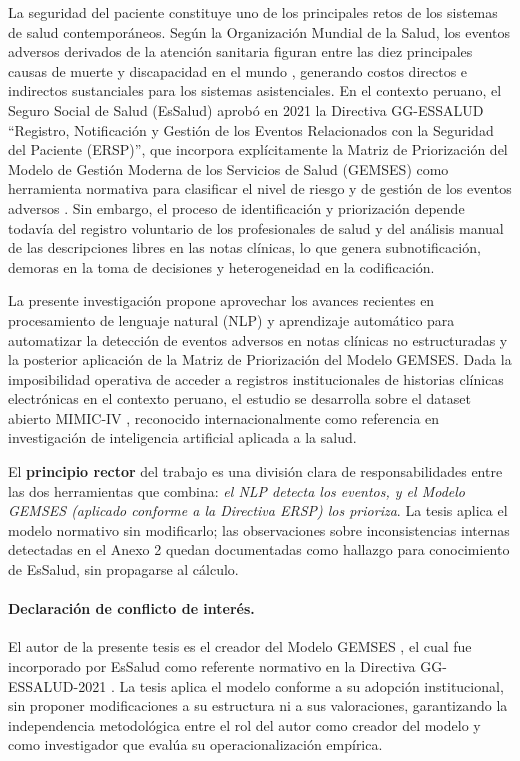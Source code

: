 La seguridad del paciente constituye uno de los principales retos de los sistemas de salud contemporáneos. Según la Organización Mundial de la Salud, los eventos adversos derivados de la atención sanitaria figuran entre las diez principales causas de muerte y discapacidad en el mundo \citep{who2019}, generando costos directos e indirectos sustanciales para los sistemas asistenciales. En el contexto peruano, el Seguro Social de Salud (EsSalud) aprobó en 2021 la Directiva GG-ESSALUD ``Registro, Notificación y Gestión de los Eventos Relacionados con la Seguridad del Paciente (ERSP)'', que incorpora explícitamente la Matriz de Priorización del Modelo de Gestión Moderna de los Servicios de Salud (GEMSES) como herramienta normativa para clasificar el nivel de riesgo y de gestión de los eventos adversos \citep{essalud2021}. Sin embargo, el proceso de identificación y priorización depende todavía del registro voluntario de los profesionales de salud y del análisis manual de las descripciones libres en las notas clínicas, lo que genera subnotificación, demoras en la toma de decisiones y heterogeneidad en la codificación.

La presente investigación propone aprovechar los avances recientes en procesamiento de lenguaje natural (NLP) y aprendizaje automático para automatizar la detección de eventos adversos en notas clínicas no estructuradas y la posterior aplicación de la Matriz de Priorización del Modelo GEMSES. Dada la imposibilidad operativa de acceder a registros institucionales de historias clínicas electrónicas en el contexto peruano, el estudio se desarrolla sobre el dataset abierto MIMIC-IV \citep{johnson2023mimic}, reconocido internacionalmente como referencia en investigación de inteligencia artificial aplicada a la salud.

El \textbf{principio rector} del trabajo es una división clara de responsabilidades entre las dos herramientas que combina: \emph{el NLP detecta los eventos, y el Modelo GEMSES (aplicado conforme a la Directiva ERSP) los prioriza}. La tesis aplica el modelo normativo sin modificarlo; las observaciones sobre inconsistencias internas detectadas en el Anexo 2 quedan documentadas como hallazgo para conocimiento de EsSalud, sin propagarse al cálculo.

\paragraph{Declaración de conflicto de interés.}
El autor de la presente tesis es el creador del Modelo GEMSES \citep{perez2021gemses}, el cual fue incorporado por EsSalud como referente normativo en la Directiva GG-ESSALUD-2021 \citep{essalud2021}. La tesis aplica el modelo conforme a su adopción institucional, sin proponer modificaciones a su estructura ni a sus valoraciones, garantizando la independencia metodológica entre el rol del autor como creador del modelo y como investigador que evalúa su operacionalización empírica.

